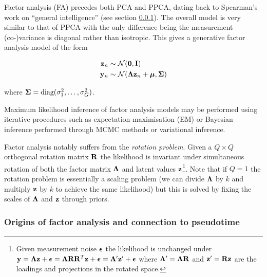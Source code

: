 Factor analysis (FA) precedes both PCA and PPCA, dating back to Spearman's work on ``general intelligence'' \cite{spearman1904general} (see section \ref{intr:fa_hist}). The overall model is very similar to that of PPCA with the only difference being the measurement (co-)variance is diagonal rather than isotropic. This gives a generative factor analysis model of the form

\begin{equation} \label{eq:fa}
  \begin{aligned}
    \mathbf{z}_n & \sim \mathcal{N}(\bm{0}, \mathbf{I}) \\
    \mathbf{y}_n & \sim \mathcal{N}(\bm{\Lambda} \mathbf{z}_n + \bm{\mu}, \bm{\Sigma})
  \end{aligned}
\end{equation}

where $\bm{\Sigma} = \text{diag}(\sigma_1^2, \ldots, \sigma_G^2)$.

Maximum likelihood inference of factor analysis models may be performed using iterative procedures such as expectation-maximisation (EM) or Bayesian inference performed through MCMC methods or variational inference.

Factor analysis notably suffers from the \emph{rotation problem}. Given a $Q \times Q$ orthogonal rotation matrix $\mathbf{R}$ the likelihood is invariant under simultaneous rotation of both the factor matrix $\bm{\Lambda}$ and latent values $\mathbf{z}$\footnote{
Given measurement noise $\bm{\epsilon}$ the likelihood is unchanged under $\mathbf{y} = \bm{\Lambda} \mathbf{z} + \bm{\epsilon} = \bm{\Lambda} \mathbf{R} \mathbf{R}^T \mathbf{z} + \bm{\epsilon} = \bm{\Lambda}' \mathbf{z}' + \bm{\epsilon}$ where $\bm{\Lambda}' = \bm{\Lambda} \mathbf{R}$ and $\mathbf{z}' = \mathbf{R} \mathbf{z}$ are the loadings and projections in the rotated space.
}. %
Note that if $Q=1$ the rotation problem is essentially a scaling problem (we can divide $\bm{\Lambda}$ by $k$ and multiply $\mathbf{z}$ by $k$ to achieve the same likelihood) but this is solved by fixing the scales of $\bm{\Lambda}$ and $\mathbf{z}$ through priors.

\subsubsection{Origins of factor analysis and connection to pseudotime} \label{intr:fa_hist}



